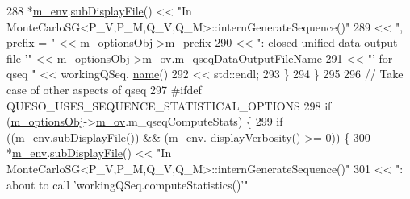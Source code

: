 \begin{DoxyCode}
288       *\hyperlink{class_q_u_e_s_o_1_1_monte_carlo_s_g_a30055a359b22cde54681679aed8ae6e7}{m\_env}.\hyperlink{class_q_u_e_s_o_1_1_base_environment_a8a0064746ae8dddfece4229b9ad374d6}{subDisplayFile}() << \textcolor{stringliteral}{"In
       MonteCarloSG<P\_V,P\_M,Q\_V,Q\_M>::internGenerateSequence()"}
289                               << \textcolor{stringliteral}{", prefix = "}                         << 
      \hyperlink{class_q_u_e_s_o_1_1_monte_carlo_s_g_acf7ce935648fd3a5d0ee23685708b4ca}{m\_optionsObj}->\hyperlink{class_q_u_e_s_o_1_1_monte_carlo_s_g_options_ac640fa60af7134d4113e9b7481a34f6c}{m\_prefix}
290                               << \textcolor{stringliteral}{": closed unified data output file '"} << 
      \hyperlink{class_q_u_e_s_o_1_1_monte_carlo_s_g_acf7ce935648fd3a5d0ee23685708b4ca}{m\_optionsObj}->\hyperlink{class_q_u_e_s_o_1_1_monte_carlo_s_g_options_a4bc6849a41ede87425cad9ab6e97df11}{m\_ov}.\hyperlink{class_q_u_e_s_o_1_1_mc_options_values_a1c2a61e5c129ba0c4c2455b75709feee}{m\_qseqDataOutputFileName}
291                               << \textcolor{stringliteral}{"' for qseq "}                         << workingQSeq.
      \hyperlink{class_q_u_e_s_o_1_1_base_vector_sequence_a48f6fe02cf77f4233d3bcdfef3870f19}{name}()
292                               << std::endl;
293     \}
294   \}
295 
296   \textcolor{comment}{// Take case of other aspects of qseq}
297 \textcolor{preprocessor}{#ifdef QUESO\_USES\_SEQUENCE\_STATISTICAL\_OPTIONS}
298 \textcolor{preprocessor}{}  \textcolor{keywordflow}{if} (\hyperlink{class_q_u_e_s_o_1_1_monte_carlo_s_g_acf7ce935648fd3a5d0ee23685708b4ca}{m\_optionsObj}->\hyperlink{class_q_u_e_s_o_1_1_monte_carlo_s_g_options_a4bc6849a41ede87425cad9ab6e97df11}{m\_ov}.m\_qseqComputeStats) \{
299     \textcolor{keywordflow}{if} ((\hyperlink{class_q_u_e_s_o_1_1_monte_carlo_s_g_a30055a359b22cde54681679aed8ae6e7}{m\_env}.\hyperlink{class_q_u_e_s_o_1_1_base_environment_a8a0064746ae8dddfece4229b9ad374d6}{subDisplayFile}()) && (\hyperlink{class_q_u_e_s_o_1_1_monte_carlo_s_g_a30055a359b22cde54681679aed8ae6e7}{m\_env}.
      \hyperlink{class_q_u_e_s_o_1_1_base_environment_a1fe5f244fc0316a0ab3e37463f108b96}{displayVerbosity}() >= 0)) \{
300       *\hyperlink{class_q_u_e_s_o_1_1_monte_carlo_s_g_a30055a359b22cde54681679aed8ae6e7}{m\_env}.\hyperlink{class_q_u_e_s_o_1_1_base_environment_a8a0064746ae8dddfece4229b9ad374d6}{subDisplayFile}() << \textcolor{stringliteral}{"In
       MonteCarloSG<P\_V,P\_M,Q\_V,Q\_M>::internGenerateSequence()"}
301                               << \textcolor{stringliteral}{": about to call 'workingQSeq.computeStatistics()'"}

\end{DoxyCode}
